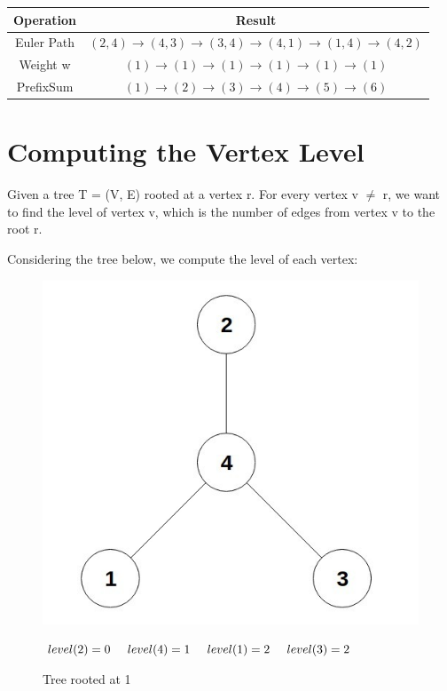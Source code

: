 \documentclass[twoside]{article}
\begin{document}
\begin{center}
 \begin{tabular}{||c c||} 
 \hline
    Operation & Result \\
 \hline
 	Euler Path & $(2,4)\to(4,3)\to(3,4)\to(4,1)\to(1,4)\to(4,2)$ \\ 
 \hline
 	Weight w & $(1)\to(1)\to(1)\to(1)\to(1)\to(1)$ \\
 \hline
 	PrefixSum & $(1)\to(2)\to(3)\to(4)\to(5)\to(6)$ \\
 \hline
\end{tabular}
\end{center}

\section{Computing the Vertex Level}
Given a tree T = (V, E) rooted at a vertex r. For every vertex v $\neq$ r, we want to find the level of vertex v, which is the number of edges from vertex v to the root r.

Considering the tree below, we compute the level of each vertex:

\begin{figure}[!h]
\centering
\begin{minipage}{.5\textwidth}
  \centering
  \includegraphics[scale=.25]{g2}
  \caption{Tree rooted at 1} 
  $level(2) = 0\hspace{0.5cm}level(4) = 1\hspace{0.5cm}level(1) = 2 \hspace{0.5cm}level(3) = 2$
  \label{fig:test1}
\end{minipage}%
\end{figure}
\end{document}
